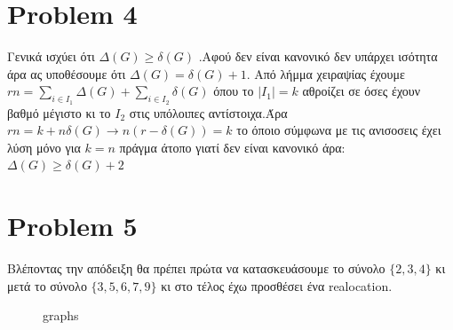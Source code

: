 \documentclass{article}
\begin{document}
\section*{Problem 4}
Γενικά ισχύει ότι $\Delta(G) \ge \delta(G)$ .Αφού δεν είναι κανονικό δεν υπάρχει ισότητα άρα ας υποθέσουμε ότι $\Delta(G) = \delta(G)+1$. Από λήμμα χειραψίας έχουμε $rn=\sum_{i \in I_1}\Delta(G) + \sum_{i \in I_2}\delta(G)$ όπου το $|I_1|=k $ αθροίζει σε όσες έχουν βαθμό μέγιστο κι το $I_2$ στις υπόλοιπες αντίστοιχα.Άρα $rn=k+n\delta(G)\rightarrow n(r-\delta(G))=k$ το όποιο σύμφωνα με τις ανισοσεις έχει λύση μόνο για $k=n $ πράγμα άτοπο γιατί δεν είναι κανονικό άρα: $\Delta(G) \ge \delta(G)+2$
\section*{Problem 5}
Βλέποντας την απόδειξη θα πρέπει πρώτα να κατασκευάσουμε το σύνολο $\{2,3,4\}$ κι μετά το σύνολο $\{3,5,6,7,9\}$ κι στο τέλος έχω προσθέσει ένα realocation.
\begin{figure}[ht!]
	\centering
	\qquad
	\qquad
	\caption{graphs}
	
	
\end{figure}
\end{document}
